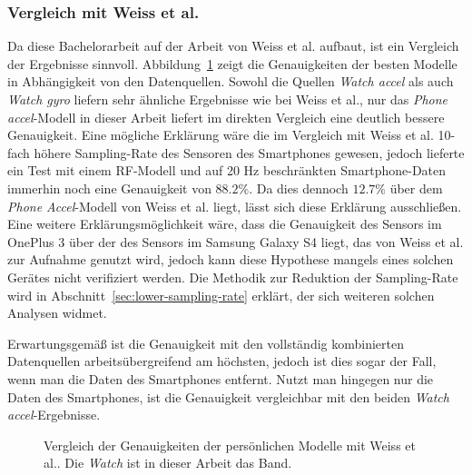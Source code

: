\subsubsection{Vergleich mit Weiss et al.}
Da diese Bachelorarbeit auf der Arbeit von Weiss et al. \cite{Weiss2016} aufbaut, ist ein Vergleich der Ergebnisse sinnvoll. Abbildung~\ref{fig:accuracy-personal-vs-weiss} zeigt die Genauigkeiten der besten Modelle in Abhängigkeit von den Datenquellen. Sowohl die Quellen \textit{Watch accel} als auch \textit{Watch gyro} liefern sehr ähnliche Ergebnisse wie bei Weiss et al., nur das \textit{Phone accel}-Modell in dieser Arbeit liefert im direkten Vergleich eine deutlich bessere Genauigkeit. Eine mögliche Erklärung wäre die im Vergleich mit Weiss et al. 10-fach höhere Sampling-Rate des Sensoren des Smartphones gewesen, jedoch lieferte ein Test mit einem RF-Modell und auf 20 Hz beschränkten Smartphone-Daten immerhin noch eine Genauigkeit von $88.2 \%$. Da dies dennoch $12.7 \%$ über dem \textit{Phone Accel}-Modell von Weiss et al. liegt, lässt sich diese Erklärung ausschließen. Eine weitere Erklärungsmöglichkeit wäre, dass die Genauigkeit des Sensors im OnePlus 3 über der des Sensors im Samsung Galaxy S4 liegt, das von Weiss et al. zur Aufnahme genutzt wird, jedoch kann diese Hypothese mangels eines solchen Gerätes nicht verifiziert werden. Die Methodik zur Reduktion der Sampling-Rate wird in Abschnitt~\ref{sec:lower-sampling-rate} erklärt, der sich weiteren solchen Analysen widmet.

Erwartungsgemäß ist die Genauigkeit mit den vollständig kombinierten Datenquellen arbeitsübergreifend am höchsten, jedoch ist dies sogar der Fall, wenn man die Daten des Smartphones entfernt. Nutzt man hingegen nur die Daten des Smartphones, ist die Genauigkeit vergleichbar mit den beiden \textit{Watch accel}-Ergebnisse.

\begin{figure}
\centering
{}
\caption[Vergleich der Genauigkeiten der persönlichen Modelle mit Weiss et al.\cite{Weiss2016}]{Vergleich der Genauigkeiten der persönlichen Modelle mit Weiss et al.\cite{Weiss2016}. Die \textit{Watch} ist in dieser Arbeit das Band.}
\label{fig:accuracy-personal-vs-weiss}
\end{figure}

